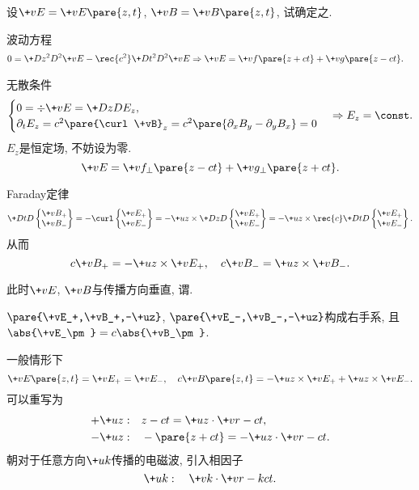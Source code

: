 \documentclass[hidelinks]{ctexart}
\begin{document}
\begin{sample}
    \begin{ex}
        设$\+vE = \+vE\pare{z,t}$, $\+vB = \+vB\pare{z,t}$, 试确定之.
        \begin{cenum}
            \item 波动方程
            \begin{align*}
                & 0 = \+D{z^2}D{^2 \+vE} - \rec{c^2}\+D{t^2}D{^2\+vE} \Rightarrow \+vE = \+vf\pare{z+ct} + \+vg\pare{z-ct}.
            \end{align*}
            \item 无散条件
            \[ \begin{cases}
                \displaystyle 0 = \div \+vE = \+DzD{E_z}, \\
                \partial_t E_z = c^2 \pare{\curl \+vB}_z = c^2\pare{\partial_x B_y - \partial_y B_x} = 0
            \end{cases} \Rightarrow E_z = \const. \]
            $E_z$是恒定场, 不妨设为零.
            \[ \+vE = \+vf_\perp \pare{z-ct} + \+vg_\perp \pare{z+ct}. \]
            \item Faraday定律
            \[ \+DtD{}\begin{Bmatrix}
                \+vB_+ \\ \+vB_-
            \end{Bmatrix} = -\curl \begin{Bmatrix}
                \+vE_+ \\ \+vE_-
            \end{Bmatrix} = -\+uz \times \+DzD{} \begin{Bmatrix}
                \+vE_+ \\ \+vE_-
            \end{Bmatrix} = -\+uz \times \rec{c} \+DtD{} \begin{Bmatrix}
                \+vE_+ \\ \+vE_-
            \end{Bmatrix}. \]
            从而
            \[ c\+vB_+ = -\+uz \times \+vE_+,\quad c\+vB_- = \+uz \times \+vB_-. \]
        \end{cenum}
    \end{ex}
\end{sample}
\begin{cenum}
    \item 此时$\+vE$, $\+vB$与传播方向垂直, 谓.
    \item $\pare{\+vE_+,\+vB_+,-\+uz}$, $\pare{\+vE_-,\+vB_-,-\+uz}$构成右手系, 且$\abs{\+vE_\pm} = c\abs{\+vB_\pm}$.
\end{cenum}
一般情形下
\[ \+vE\pare{z,t} = \+vE_+ = \+vE_-,\quad c\+vB\pare{z,t} = -\+uz\times \+vE_+ + \+uz\times \+vE_-. \]
可以重写为
\begin{align*}
    +\+uz:&\quad z-ct = \+uz \cdot \+vr - ct, \\
    -\+uz:&\quad -\pare{z+ct} = -\+uz\cdot \+vr - ct.
\end{align*}
朝对于任意方向$\+uk$传播的电磁波, 引入相因子
\[ \+uk:\quad \+vk\cdot \+vr - kct. \]
\end{document}
